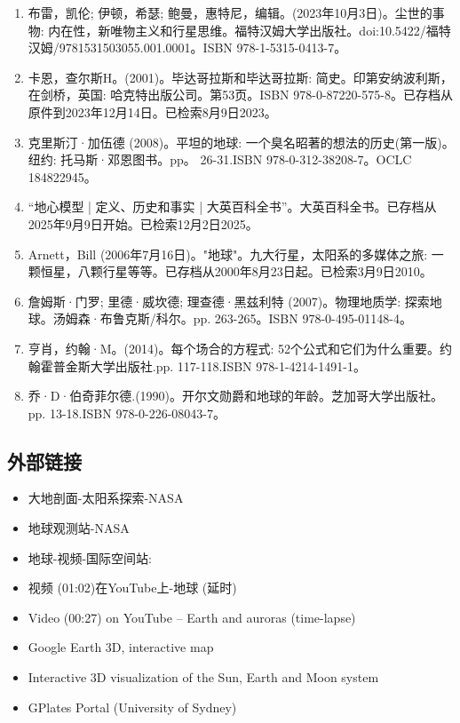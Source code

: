 \begin{enumerate}
\item 布雷，凯伦; 伊顿，希瑟; 鲍曼，惠特尼，编辑。(2023年10月3日)。尘世的事物: 内在性，新唯物主义和行星思维。福特汉姆大学出版社。doi:10.5422/福特汉姆/9781531503055.001.0001。ISBN 978-1-5315-0413-7。
\item 卡恩，查尔斯H。(2001)。毕达哥拉斯和毕达哥拉斯: 简史。印第安纳波利斯，在剑桥，英国: 哈克特出版公司。第53页。ISBN 978-0-87220-575-8。已存档从原件到2023年12月14日。已检索8月9日2023。
\item 克里斯汀·加伍德 (2008)。平坦的地球: 一个臭名昭著的想法的历史(第一版)。纽约: 托马斯·邓恩图书。pp。 26-31.ISBN 978-0-312-38208-7。OCLC 184822945。
\item “地心模型 | 定义、历史和事实 | 大英百科全书”。大英百科全书。已存档从2025年9月9日开始。已检索12月2日2025。
\item Arnett，Bill (2006年7月16日)。"地球"。九大行星，太阳系的多媒体之旅: 一颗恒星，八颗行星等等。已存档从2000年8月23日起。已检索3月9日2010。
\item 詹姆斯·门罗; 里德·威坎德; 理查德·黑兹利特 (2007)。物理地质学: 探索地球。汤姆森·布鲁克斯/科尔。pp. 263-265。ISBN 978-0-495-01148-4。
\item 亨肖，约翰·M。(2014)。每个场合的方程式: 52个公式和它们为什么重要。约翰霍普金斯大学出版社.pp. 117-118.ISBN 978-1-4214-1491-1。
\item 乔·D·伯奇菲尔德.(1990)。开尔文勋爵和地球的年龄。芝加哥大学出版社。pp. 13-18.ISBN 978-0-226-08043-7。
\end{enumerate}
\subsection{外部链接}
\begin{itemize}
\item 大地剖面-太阳系探索-NASA
\item 地球观测站-NASA
\item 地球-视频-国际空间站:
\item 视频 (01:02)在YouTube上-地球 (延时)
\item Video (00:27) on YouTube – Earth and auroras (time-lapse)
\item Google Earth 3D, interactive map
\item Interactive 3D visualization of the Sun, Earth and Moon system
\item GPlates Portal (University of Sydney)
\end{itemize}